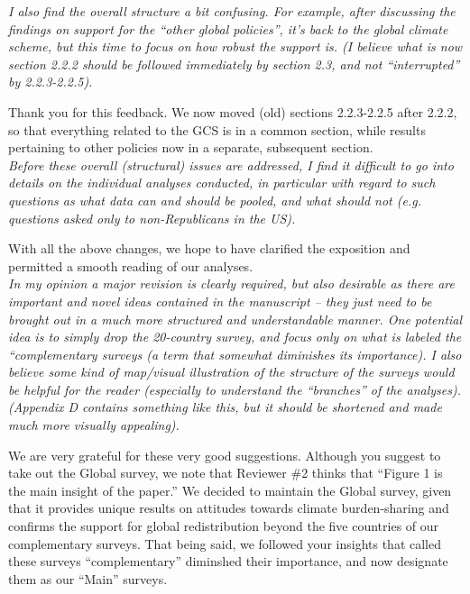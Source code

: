 \documentclass[12pt,english]{article}
\begin{document}
\textit{I also find the overall structure a bit confusing. For example, after discussing the findings on support for the “other global policies”, it’s back to the global climate scheme, but this time to focus on how robust the support is. (I believe what is now section 2.2.2 should be followed immediately by section 2.3, and not “interrupted” by 2.2.3-2.2.5).}

Thank you for this feedback. We now moved (old) sections 2.2.3-2.2.5 after 2.2.2, so that everything related to the GCS is in a common section, while results pertaining to other policies now in a separate, subsequent section.
~\\

\textit{Before these overall (structural) issues are addressed, I find it difficult to go into details on the individual analyses conducted, in particular with regard to such questions as what data can and should be pooled, and what should not (e.g. questions asked only to non-Republicans in the US).}

With all the above changes, we hope to have clarified the exposition and permitted a smooth reading of our analyses.
~\\

\textit{In my opinion a major revision is clearly required, but also desirable as there are important and novel ideas contained in the manuscript – they just need to be brought out in a much more structured and understandable manner. One potential idea is to simply drop the 20-country survey, and focus only on what is labeled the “complementary surveys (a term that somewhat diminishes its importance). I also believe some kind of map/visual illustration of the structure of the surveys would be helpful for the reader (especially to understand the “branches” of the analyses). (Appendix D contains something like this, but it should be shortened and made much more visually appealing).}

We are very grateful for these very good suggestions. Although you suggest to take out the Global survey, we note that Reviewer \#2 thinks that ``Figure 1 is the main insight of the paper.'' We decided to maintain the Global survey, given that it provides unique results on attitudes towards climate burden-sharing and confirms the support for global redistribution beyond the five countries of our complementary surveys. That being said, we followed your insights that called these surveys ``complementary'' diminshed their importance, and now designate them as our ``Main'' surveys. 
\end{document}
